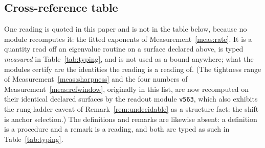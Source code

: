 \documentclass[11pt,a4paper]{article}
\theoremstyle{plain}
\theoremstyle{definition}
\begin{document}
\subsection{Cross-reference table}
\label{sec:crossref}

One reading is quoted in this paper and is not in the table below, because no
module recomputes it: the fitted exponents of Measurement~\ref{meas:rate}. It is
a quantity read off an eigenvalue routine on a surface declared above, is typed
\emph{measured} in Table~\ref{tab:typing}, and is not used as a bound anywhere;
what the modules certify are the identities the reading is a reading of. (The
tightness range of Measurement~\ref{meas:sharpness} and the four numbers of
Measurement~\ref{meas:refwindow}, originally in this list, are now recomputed on
their identical declared surfaces by the readout module \texttt{v563}, which
also exhibits the rung-ladder caveat of Remark~\ref{rem:undecidable} as a
structure fact: the shift is anchor selection.) The definitions and
remarks are likewise absent: a definition is a procedure and a remark is a
reading, and both are typed as such in Table~\ref{tab:typing}.
\end{document}
